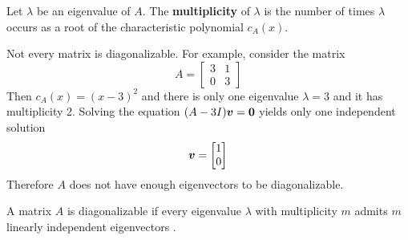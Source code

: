 \begin{definition}
Let $\lambda$ be an eigenvalue of $A$. The {\bf multiplicity} of $\lambda$ \cite[p.180]{KN} is the number of times $\lambda$ occurs as a root of the characteristic polynomial $c_A(x)$.
\end{definition}

\begin{note}
Not every matrix is diagonalizable. For example, consider the matrix
$$
A = \begin{bmatrix} 3 & 1 \\ 0 & 3 \end{bmatrix}
$$
Then $c_A(x) = (x - 3)^2$ and there is only one eigenvalue $\lambda = 3$ and it has multiplicity 2. Solving the equation $(A - 3I)\boldsymbol{v} = \boldsymbol{0}$ yields only one independent solution
$$
\boldsymbol{v} = \begin{bmatrix} 1 \\ 0 \end{bmatrix}
$$
Therefore $A$ does not have enough eigenvectors to be diagonalizable.
\end{note}

\begin{theorem}
A matrix $A$ is diagonalizable if every eigenvalue $\lambda$ with multiplicity $m$ admits $m$ linearly independent eigenvectors \cite[p.181]{KN}.
\end{theorem}
